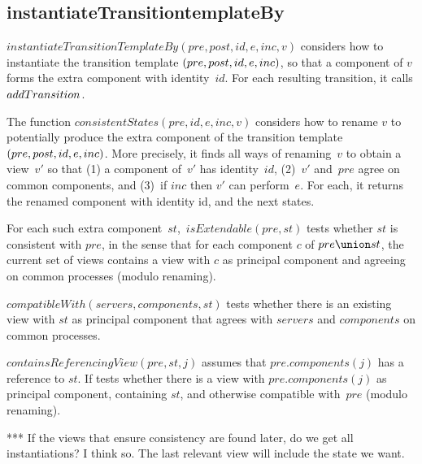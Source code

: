 
\subsection{instantiateTransitiontemplateBy}

$instantiateTransitionTemplateBy(pre, post, id, e, inc, v)$ considers how
to instantiate the transition template $(pre, post,\linebreak[1]
id,\linebreak[1] e, inc)$, so that a component of $v$ forms the extra
component with identity~$id$.  For each resulting transition, it calls
$add\-Transition$.


The function $consistentStates(pre, id, e, inc, v)$ considers how to rename
$v$ to potentially produce the extra component of the transition template
$(pre, post,\linebreak[1] id,\linebreak[1] e, inc)$.  More precisely, it finds
all ways of renaming~$v$ to obtain a view~$v'$ so that (1) a component of~$v'$
has identity~$id$, (2)~$v'$ and~$pre$ agree on common components, and (3)~if
$inc$ then $v'$ can perform~$e$.  For each, it returns the renamed component
with identity id, and the next states. 

For each such extra component~$st$,\, $isExtendable(pre, st)$ tests whether
$st$ is consistent with $pre$, in the sense that for each component $c$ of
$pre \union st$, the current set of views contains a view with $c$ as
principal component and agreeing on common processes (modulo renaming).

$compatibleWith(servers, components, st)$ tests whether there is an existing
view with $st$ as principal component that agrees with $servers$ and
$components$ on common processes. 

$containsReferencingView(pre, st, j)$ assumes that $pre.components(j)$ has a
reference to $st$.  If tests whether there is a view with $pre.components(j)$
as principal component, containing $st$, and otherwise compatible with~$pre$
(modulo renaming).

*** If the views that ensure consistency are found later, do we get all
instantiations?  I think so.  The last relevant view will include the state we
want. 
